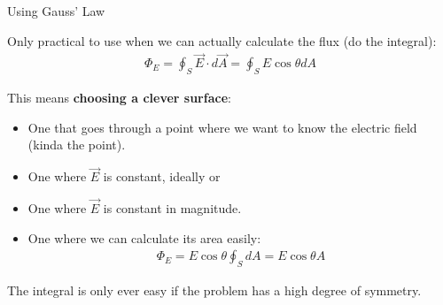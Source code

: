\documentclass[aspectratio=169,
hyperref={colorlinks,urlcolor=blue}
]{beamer}
\begin{document}
\begin{bulletframe}{Using Gauss' Law}
\item Only practical to use when we can actually calculate the flux (do the integral):
\begin{align*}
\Phi_E=\oint_S \vec E \cdot d\vec A=\oint_{S}E\cos\theta dA 
\end{align*}
\item This means \textbf{choosing a clever surface}:
\begin{itemize}
\item One that goes through a point where we want to know the electric field (kinda the point).
\item One where $\vec E$ is constant, ideally  or 
\item One where $\vec E$ is constant in magnitude.
\item One where we can calculate its area easily:
\begin{align*}
\Phi_E=E\cos\theta \oint_S dA =E\cos\theta A
\end{align*}
\end{itemize}
\item The integral is only ever easy if the problem has a high degree of symmetry.
\end{bulletframe}
\end{document}
